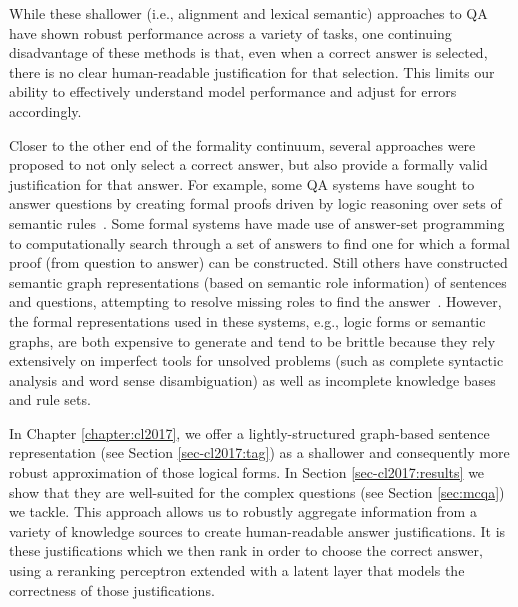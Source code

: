 While these shallower (i.e., alignment and lexical semantic) approaches to QA have shown robust performance across a variety of tasks, one continuing disadvantage of these methods is that, even when a correct answer is selected, there is no clear human-readable justification for that selection.  This limits our ability to effectively understand model performance and adjust for errors accordingly.

Closer to the other end of the formality continuum, several approaches were proposed to not only select a correct answer, but also provide a formally valid justification for that answer.  For example, some QA systems have sought to answer questions by creating formal proofs driven by logic reasoning over sets of semantic rules~\citep[e.g.,][]{moldovan2003cogex,moldovan2007cogex,
balduccini2008knowledge,
maccartney2009natural,liang2013learning,
lewis2013combining}.
Some formal systems have made use of answer-set programming \citep{baral2006using,baral2011towards,baral2012answering,
baral2012knowledge} to computationally search through a set of answers to find one for which a formal proof (from question to answer) can be constructed. 
Still others have constructed semantic graph representations (based on semantic role information) of sentences and questions, attempting to resolve missing roles to find the answer~\citep[e.g.,][]{banarescu2012amr,sharmatowards}. 
However, the formal representations used in these systems, e.g., logic forms or semantic graphs, are both expensive to generate and tend to be brittle because they rely extensively on imperfect tools for unsolved problems (such as complete syntactic analysis and word sense disambiguation) as well as incomplete knowledge bases and rule sets.  %

In Chapter \ref{chapter:cl2017}, we offer a lightly-structured graph-based sentence representation (see Section \ref{sec-cl2017:tag}) as a shallower and consequently more robust approximation of those logical forms.  In Section \ref{sec-cl2017:results} we show that they are well-suited for the complex questions (see Section \ref{sec:mcqa}) we tackle.
This approach allows us to robustly aggregate information from a variety of knowledge sources to create human-readable answer justifications.  
It is these justifications which we then rank in order to choose the correct answer, using a reranking perceptron extended with a latent layer that models the correctness of those justifications.

